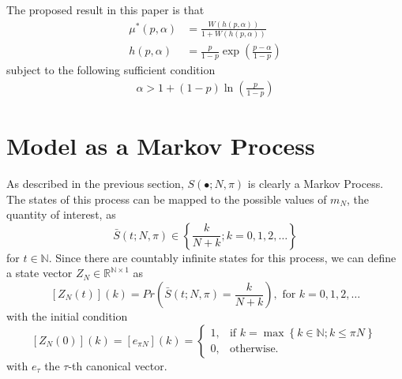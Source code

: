 \documentclass{article}
\newcommand{\N}{\mathbb{N}}
\newcommand{\R}{\mathbb{R}}
\newcommand{\sset}[1]{\left\{ #1 \right\}}
\newcommand{\ppar}[1]{\left( #1 \right)}
\newcommand{\spar}[1]{\left[ #1 \right]}
\begin{document}
The proposed result in this paper is that
\begin{align}
    {\mu^*}\ppar{p, \alpha} &= \frac{W\ppar{h\ppar{p, \alpha}}}{1+W\ppar{h\ppar{p, \alpha}}}
    \\
    h\ppar{p, \alpha} &=
    \frac{p}{1-p} \exp{\ppar{\frac{p-\alpha}{1-p}}}
\end{align}
subject to the following sufficient condition
\begin{align}
    \alpha > 1 + \ppar{1-p} \ln{\ppar{\frac{p}{1-p}}} 
\end{align}

\section{Model as a Markov Process}

As described in the previous section, $S(\bullet; N, \pi)$ is clearly a Markov Process.
%
The states of this process can be mapped to the possible values of $m_N$, the quantity of interest, as
\begin{equation}
    \bar{S}(t; N, \pi) \in \sset{\frac{k}{N+k}; k = 0, 1, 2, \dots}
\end{equation}
for $t\in \N$. 
%
Since there are countably infinite states for this process, we can define a state vector $Z_N \in \R^{\N\times 1}$ as
\begin{equation}
    \spar{Z_N(t)}(k) = Pr\ppar{\bar{S}(t; N, \pi) = \frac{k}{N+k}}, \text{ for } k=0,1, 2, \dots
\end{equation}
with the initial condition
\begin{equation}
    \spar{Z_N(0)}(k) = \spar{e_{\pi N}}(k) = \begin{cases}
        1, &\text{if } k = \max\sset{k\in \N; k \leq \pi N} \\
        0, &\text{otherwise.}
    \end{cases}
\end{equation}
with $e_\tau$ the $\tau$-th canonical vector.
\end{document}
